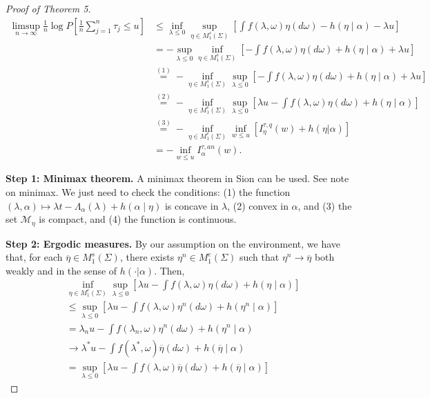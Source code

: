 \begin{proof}[Proof of Theorem 5]
\begin{align*}
	\limsup _{n \rightarrow \infty} \frac{1}{n} \log P\left[\frac{1}{n} \sum_{j=1}^n \tau_j \leq u\right]
	&\leq \inf _{\lambda \leq 0} \sup _{\eta \in M_1^s(\Sigma)}\left[\int f(\lambda, \omega) \eta(d \omega)-h(\eta \mid \alpha)-\lambda u\right] \\
	&= - \sup _{\lambda \le 0} \inf _{\eta \in M_1^s(\Sigma)} \left[ -\int f(\lambda, \omega) \eta(d \omega)+h(\eta \mid \alpha)+\lambda u \right] \\
	&\stackrel{(1)}{=} - \inf_{\eta \in M_1^s(\Sigma)} \sup_{\lambda \le 0} \left[ -\int f(\lambda, \omega) \eta(d \omega)+h(\eta \mid \alpha)+\lambda u \right] \\
	&\stackrel{(2)}{=} - \inf_{\eta \in M_1^e(\Sigma)} \sup_{\lambda \le 0} \left[ \lambda u - \int f(\lambda, \omega) \eta(d \omega)+h(\eta \mid \alpha) \right] \\
	&\stackrel{(3)}{=} - \inf_{\eta \in M_1^e(\Sigma)} \inf _{w \leq u} \left[ I_\eta^{\tau, q}(w) + h(\eta | \alpha) \right] \\
	&= - \inf _{w \leq u} I_\alpha ^{\tau, an}(w) 
.\end{align*}

\textbf{Step 1: Minimax theorem.} 
A minimax theorem in Sion \autocite[Theorem~4.2']{sionGeneralMinimax1958} can be used. See note on minimax. We just need to check the conditions: (1) the function $(\lambda, \alpha) \mapsto \lambda t-\Lambda_\alpha(\lambda)+h(\alpha \mid \eta)$ is concave in $\lambda$, (2) convex in $\alpha$, and (3) the set $\mathcal{M}_\eta$ is compact, and (4) the function is continuous.

\textbf{Step 2: Ergodic measures.}
By our assumption on the environment, we have that, for each $\overline{\eta} \in M_1^s(\Sigma)$, there exists $\eta^n \in M_1^e(\Sigma)$ such that $\eta^n \to \overline{\eta}$ both weakly and in the sense of $h(\cdot | \alpha)$. Then,
\begin{align*}
	&\inf_{\eta \in M_1^e(\Sigma)} \sup_{\lambda \le 0} \left[ \lambda u - \int f(\lambda, \omega) \eta(d \omega)+h(\eta \mid \alpha) \right]\\
	&\leq \sup_{\lambda \le 0} \left[ \lambda u - \int f(\lambda, \omega) \eta^n (d \omega)+h(\eta^n \mid \alpha) \right] \\
	&= \lambda_n u - \int f(\lambda_n, \omega) \eta^n (d \omega)+h(\eta^n \mid \alpha)\\
	&\to \lambda^* u - \int f(\lambda^*, \omega) \overline{\eta} (d \omega)+h(\overline{\eta} \mid \alpha)\\
	&= \sup_{\lambda \le 0} \left[ \lambda u - \int f(\lambda, \omega) \overline{\eta} (d \omega)+h(\overline{\eta} \mid \alpha) \right]
\end{align*}


\end{proof}
